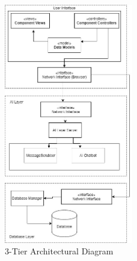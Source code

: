 \documentclass[11pt]{article}
\begin{document}
\begin{figure}[H]
	\centering
	\includegraphics[width=0.5\textwidth]{../../images/Botic_Simplified_Architectural_Design.jpg}
	\caption{3-Tier Architectural Diagram}
\end{figure}
\end{document}
